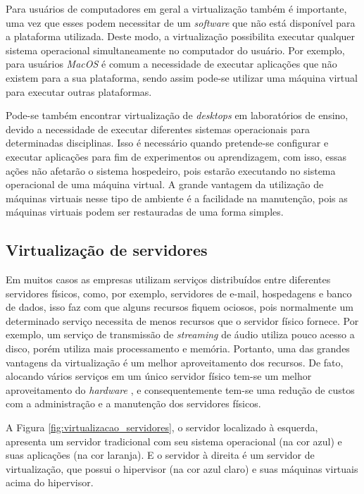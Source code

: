 Para usuários de computadores em geral a virtualização também é importante, uma vez que esses podem necessitar de um \textit{software} que não
está disponível para a plataforma utilizada. Deste modo, a virtualização possibilita executar qualquer sistema operacional simultaneamente no 
computador do usuário. Por exemplo, para usuários \textit{MacOS} é comum a necessidade de executar aplicações que não existem para a sua 
plataforma, sendo assim pode-se utilizar uma máquina virtual para executar outras plataformas.

Pode-se também encontrar virtualização de \textit{desktops} em laboratórios de ensino, devido a necessidade de executar diferentes sistemas 
operacionais para determinadas disciplinas. Isso é necessário quando pretende-se configurar e executar aplicações para fim de experimentos ou
aprendizagem, com isso, essas ações não afetarão o sistema hospedeiro, pois estarão executando no sistema operacional de uma máquina virtual. 
A grande vantagem da utilização de máquinas virtuais nesse tipo de ambiente é a facilidade na manutenção, pois as máquinas virtuais podem
ser restauradas de uma forma simples.

\subsection{Virtualização de servidores}
\label{section:virtdesk}

Em muitos casos as empresas utilizam serviços distribuídos entre diferentes servidores físicos, como, por exemplo, servidores de e-mail, 
hospedagens e banco de dados, isso faz com que alguns recursos fiquem ociosos, pois normalmente um determinado serviço necessita de menos
recursos que o servidor físico fornece. Por exemplo, um serviço de transmissão de \textit{streaming} de áudio utiliza pouco acesso a disco,
porém utiliza mais processamento e memória.
Portanto, uma das grandes vantagens da virtualização é um melhor aproveitamento dos recursos. De fato, alocando vários serviços em um único 
servidor físico tem-se um melhor aproveitamento do \textit{hardware} \cite{moreira2006}, e consequentemente tem-se uma redução de custos com a 
administração e a manutenção dos servidores físicos.

A Figura \ref{fig:virtualizacao_servidores}, o servidor localizado à esquerda, apresenta um servidor tradicional com seu sistema operacional 
(na cor azul) e suas aplicações (na cor laranja). E o servidor à direita é um servidor de virtualização, que possui o hipervisor 
(na cor azul claro) e suas máquinas virtuais acima do hipervisor.

